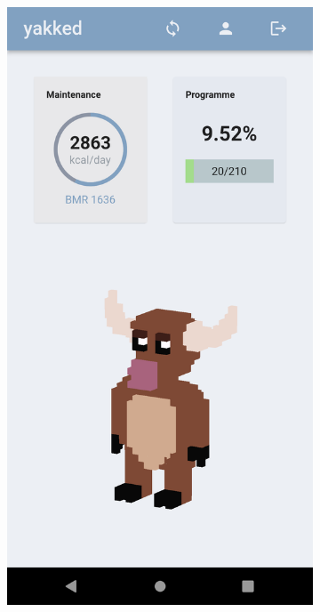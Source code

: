 

\begin{figure}[h!]
  \centering
  \begin{subfigure}[b]{0.21\linewidth}
    \includegraphics[width=\linewidth]{resume/imgs/yakked/mob1.png}
  \end{subfigure}

\end{figure}
